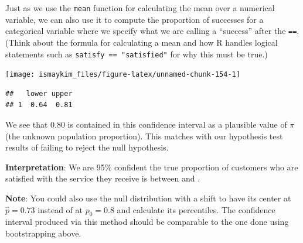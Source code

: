 \documentclass[]{tufte-book}
\newenvironment{Shaded}{\begin{snugshade}}{\end{snugshade}}
\newcommand{\KeywordTok}[1]{\textcolor[rgb]{0.13,0.29,0.53}{\textbf{{#1}}}}
\newcommand{\DataTypeTok}[1]{\textcolor[rgb]{0.13,0.29,0.53}{{#1}}}
\newcommand{\DecValTok}[1]{\textcolor[rgb]{0.00,0.00,0.81}{{#1}}}
\newcommand{\FloatTok}[1]{\textcolor[rgb]{0.00,0.00,0.81}{{#1}}}
\newcommand{\StringTok}[1]{\textcolor[rgb]{0.31,0.60,0.02}{{#1}}}
\newcommand{\NormalTok}[1]{{#1}}
\theoremstyle{definition}
\theoremstyle{definition}
\theoremstyle{remark}
\begin{document}
Just as we use the \texttt{mean} function for calculating the mean over
a numerical variable, we can also use it to compute the proportion of
successes for a categorical variable where we specify what we are
calling a ``success'' after the \texttt{==}. (Think about the formula
for calculating a mean and how R handles logical statements such as
\texttt{satisfy\ ==\ "satisfied"} for why this must be true.)

\begin{Shaded}
\end{Shaded}

\begin{center}\texttt{[image: ismaykim\_files/figure-latex/unnamed-chunk-154-1]} \end{center}

\begin{Shaded}
\end{Shaded}

\begin{verbatim}
##   lower upper
## 1  0.64  0.81
\end{verbatim}

We see that 0.80 is contained in this confidence interval as a plausible
value of \(\pi\) (the unknown population proportion). This matches with
our hypothesis test results of failing to reject the null hypothesis.

\textbf{Interpretation}: We are 95\% confident the true proportion of
customers who are satisfied with the service they receive is between and
.

\textbf{Note}: You could also use the null distribution with a shift to
have its center at \(\hat{p} = 0.73\) instead of at \(p_0 = 0.8\) and
calculate its percentiles. The confidence interval produced via this
method should be comparable to the one done using bootstrapping above.
\end{document}
